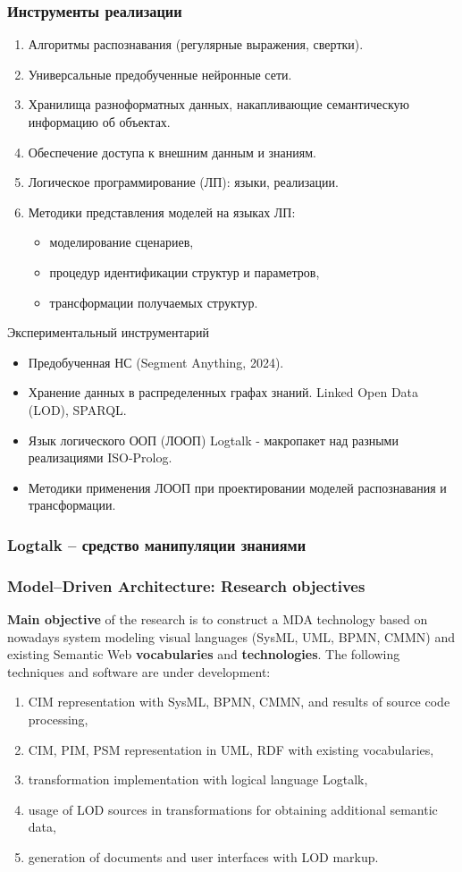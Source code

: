 \documentclass[10pt]{beamer}
\begin{document}
\begin{frame}
  \frametitle{Инструменты реализации}
  \begin{enumerate}
  \item Алгоритмы распознавания (регулярные выражения, свертки).
  \item Универсальные предобученные нейронные сети.
  \item Хранилища разноформатных данных, накапливающие семантическую информацию об объектах.
  \item Обеспечение доступа к внешним данным и знаниям.
  \item Логическое программирование (ЛП): языки, реализации.
  \item Методики представления моделей на языках ЛП:
    \begin{itemize}
    \item моделирование сценариев,
    \item процедур идентификации структур и параметров,
    \item трансформации получаемых структур.
    \end{itemize}
  \end{enumerate}
  Экспериментальный инструментарий
  \begin{itemize}
  \item Предобученная НС (Segment Anything, 2024).
  \item Хранение данных в распределенных графах знаний. Linked Open Data (LOD), SPARQL.
  \item Язык логического ООП (ЛООП) Logtalk - макропакет над разными реализациями ISO-Prolog.
    \item Методики применения ЛООП при проектировании моделей распознавания и трансформации.
  \end{itemize}
\end{frame}

\begin{frame}
  \frametitle{Logtalk -- средство манипуляции знаниями}

\end{frame}

\begin{frame}
  \frametitle{Model--Driven Architecture: Research objectives}
  \textbf{Main objective} of the research is to construct a MDA technology based on nowadays system modeling visual languages (SysML, UML, BPMN, CMMN) and existing Semantic Web \textbf{vocabularies} and \textbf{technologies}. The following techniques and software are under development:
  \begin{enumerate}
  \item CIM representation with SysML, BPMN, CMMN, and results of source code processing,
  \item CIM, PIM, PSM representation in UML, RDF with existing vocabularies,
  \item transformation implementation with logical language Logtalk,
  \item usage of LOD sources in transformations for obtaining additional semantic data,
  \item generation of documents and user interfaces with LOD markup.
  \end{enumerate}
\end{frame}
\end{document}
